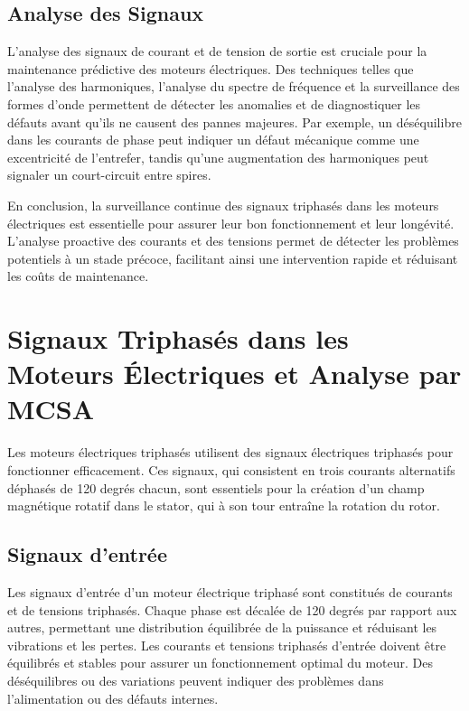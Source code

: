 \subsection*{Analyse des Signaux}

L'analyse des signaux de courant et de tension de sortie est cruciale pour la
maintenance prédictive des moteurs électriques. Des techniques telles que
l'analyse des harmoniques, l'analyse du spectre de fréquence et la surveillance
des formes d'onde permettent de détecter les anomalies et de diagnostiquer les
défauts avant qu'ils ne causent des pannes majeures. Par exemple, un
déséquilibre dans les courants de phase peut indiquer un défaut mécanique comme
une excentricité de l'entrefer, tandis qu'une augmentation des harmoniques peut
signaler un court-circuit entre spires.

En conclusion, la surveillance continue des signaux triphasés dans les moteurs
électriques est essentielle pour assurer leur bon fonctionnement et leur
longévité. L'analyse proactive des courants et des tensions permet de détecter
les problèmes potentiels à un stade précoce, facilitant ainsi une intervention
rapide et réduisant les coûts de maintenance.

\section*{Signaux Triphasés dans les Moteurs Électriques et Analyse par MCSA}

Les moteurs électriques triphasés utilisent des signaux électriques triphasés
pour fonctionner efficacement. Ces signaux, qui consistent en trois courants
alternatifs déphasés de 120 degrés chacun, sont essentiels pour la création
d'un champ magnétique rotatif dans le stator, qui à son tour entraîne la
rotation du rotor.

\subsection*{Signaux d'entrée}

Les signaux d'entrée d'un moteur électrique triphasé sont constitués de
courants et de tensions triphasés. Chaque phase est décalée de 120 degrés par
rapport aux autres, permettant une distribution équilibrée de la puissance et
réduisant les vibrations et les pertes. Les courants et tensions triphasés
d'entrée doivent être équilibrés et stables pour assurer un fonctionnement
optimal du moteur. Des déséquilibres ou des variations peuvent indiquer des
problèmes dans l'alimentation ou des défauts internes.

